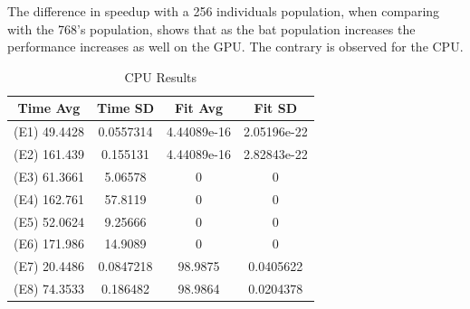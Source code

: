 \documentclass[conference]{IEEEtran}
\begin{document}
The difference in speedup with a 256 individuals population, when
comparing with the 768's population, shows that as the bat population
increases the performance increases as well on the GPU. The contrary is
observed for the CPU.





\begin{table}[H]
    \renewcommand{\arraystretch}{1.3}
    \caption{CPU Results}
    \label{results-cpu}
    \centering
    \begin{tabular}{c|c|c|c}
    \hline
        Time Avg & Time SD & Fit Avg & Fit SD\\
    \hline
        (E1) 49.4428 & 0.0557314 & 4.44089e-16 & 2.05196e-22 \\
        (E2) 161.439 & 0.155131 & 4.44089e-16 & 2.82843e-22 \\
        (E3) 61.3661 & 5.06578   & 0  & 0 \\
        (E4) 162.761 & 57.8119 & 0 & 0 \\
        (E5) 52.0624 & 9.25666   & 0  & 0 \\
        (E6) 171.986 & 14.9089 & 0 & 0 \\
        (E7) 20.4486 & 0.0847218 & 98.9875 & 0.0405622 \\
        (E8) 74.3533 & 0.186482 & 98.9864 & 0.0204378 \\
    \end{tabular}
\end{table}
\end{document}
